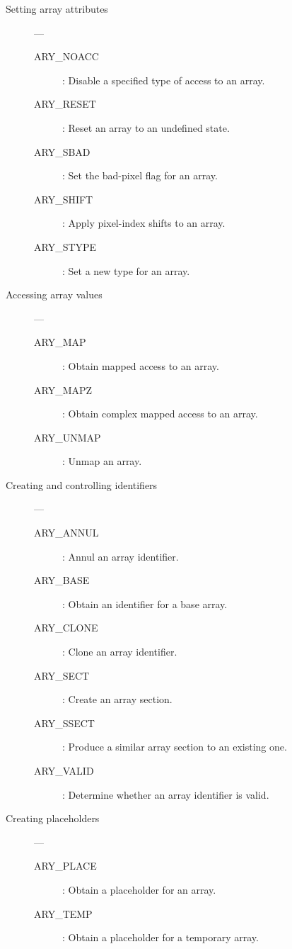 \begin{description}
\item [Setting array attributes] ---

\begin{description}
\item [ARY\_NOACC] : Disable a specified type of access to an array.
\item [ARY\_RESET] : Reset an array to an undefined state.
\item [ARY\_SBAD] : Set the bad-pixel flag for an array.
\item [ARY\_SHIFT] : Apply pixel-index shifts to an array.
\item [ARY\_STYPE] : Set a new type for an array.
\end{description}

\item [Accessing array values] ---

\begin{description}
\item [ARY\_MAP] : Obtain mapped access to an array.
\item [ARY\_MAPZ] : Obtain complex mapped access to an array.
\item [ARY\_UNMAP] : Unmap an array.
\end{description}

\item [Creating and controlling identifiers] ---

\begin{description}
\item [ARY\_ANNUL] : Annul an array identifier.
\item [ARY\_BASE] : Obtain an identifier for a base array.
\item [ARY\_CLONE] : Clone an array identifier.
\item [ARY\_SECT] : Create an array section.
\item [ARY\_SSECT] : Produce a similar array section to an existing one.
\item [ARY\_VALID] : Determine whether an array identifier is valid.
\end{description}

\item [Creating placeholders] ---

\begin{description}
\item [ARY\_PLACE] : Obtain a placeholder for an array.
\item [ARY\_TEMP] : Obtain a placeholder for a temporary array.
\end{description}


\end{description}
